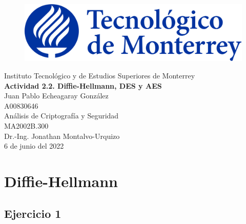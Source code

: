 \documentclass{article}
\begin{document}
    \begin{titlepage}
        \begin{center}
            \begin{figure}
                \centering
                \includegraphics[scale=0.13]{../../../img/logo_itesm.png}\\ %
            \end{figure}
        \vspace{5cm}
        \LARGE{Instituto Tecnológico y de Estudios Superiores de Monterrey}\\
        \fontsize{12}{14}\selectfont
        \vspace{1cm}
        \textbf{Actividad 2.2. Diffie-Hellmann, DES y AES}\\ %
        \vspace{0.7cm}
        Juan Pablo Echeagaray González\\ %
        \vspace{0.2cm}
        A00830646\\ %
        \vspace{0.7cm}
        Análisis de Criptografía y Seguridad\\ %
        \vspace{0.2cm}
        MA2002B.300\\ %
        \vspace{0.2cm}
        Dr.-Ing. Jonathan Montalvo-Urquizo\\ %
        \vspace{0.7cm}
        6 de junio del 2022\\ %
        \end{center}
    \end{titlepage}

    \section{Diffie-Hellmann}

        \subsection*{Ejercicio 1}
\end{document}
